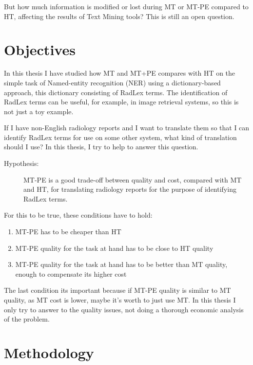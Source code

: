 But how much information is modified or lost during MT or MT-PE compared to HT, affecting the results of Text Mining tools? This is still an open question. 

\section{Objectives}

In this thesis I have studied how MT and MT+PE compares with HT on the simple task of Named-entity recognition (NER) using a dictionary-based approach, this dictionary consisting of RadLex terms. The identification of RadLex terms can be useful, for example, in image retrieval \citep{Gerstmair2012} systems, so this is not just a toy example. 

If I have non-English radiology reports and I want to translate them so that I can identify RadLex terms for use on some other system, what kind of translation should I use? In this thesis, I try to help to answer this question. 

\newcommand{\hypothesis}{
\begin{description}
	\item[Hypothesis:] MT-PE is a good trade-off between quality and cost, compared with MT and HT, for translating radiology reports for the purpose of identifying RadLex terms. 
\end{description}
}
\hypothesis

For this to be true, these conditions have to hold:

\begin{enumerate}
	\item MT-PE has to be cheaper than HT
	\item MT-PE quality for the task at hand has to be close to HT quality
	\item MT-PE quality for the task at hand has to be better than MT quality, enough to compensate its higher cost
\end{enumerate}

The last condition its important because if MT-PE quality is similar to MT quality, as MT cost is lower, maybe it's worth to just use MT. In this thesis I only try to answer to the quality issues, not doing a thorough economic analysis of the problem. 

\section{Methodology}


